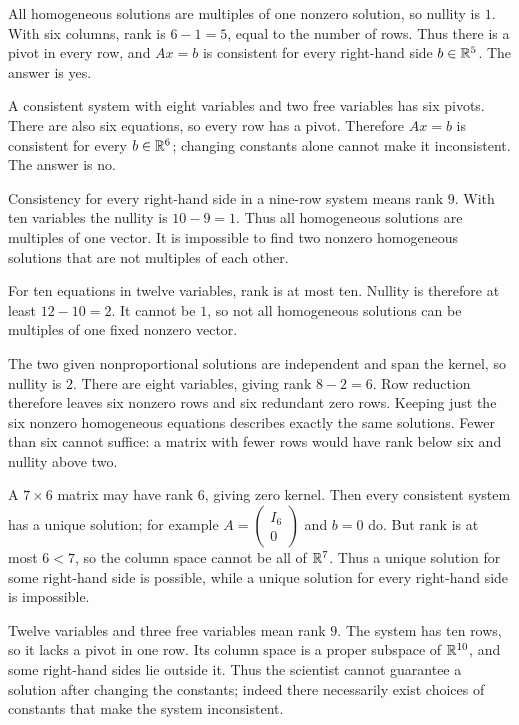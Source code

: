 All homogeneous solutions are multiples of one nonzero solution, so nullity
is $1$. With six columns, rank is $6-1=5$, equal to the number of rows.
Thus there is a pivot in every row, and $Ax=b$ is consistent for every
right-hand side $b\in\mathbb{R}^5$. The answer is yes.

A consistent system with eight variables and two free variables has six
pivots. There are also six equations, so every row has a pivot. Therefore
$Ax=b$ is consistent for every $b\in\mathbb{R}^6$; changing constants alone cannot
make it inconsistent. The answer is no.

Consistency for every right-hand side in a nine-row system means rank $9$.
With ten variables the nullity is $10-9=1$. Thus all homogeneous solutions
are multiples of one vector. It is impossible to find two nonzero
homogeneous solutions that are not multiples of each other.

For ten equations in twelve variables, rank is at most ten. Nullity is
therefore at least $12-10=2$. It cannot be $1$, so not all homogeneous
solutions can be multiples of one fixed nonzero vector.

The two given nonproportional solutions are independent and span the kernel,
so nullity is $2$. There are eight variables, giving rank $8-2=6$.
Row reduction therefore leaves six nonzero rows and six redundant zero rows.
Keeping just the six nonzero homogeneous equations describes exactly the same
solutions. Fewer than six cannot suffice: a matrix with fewer rows would
have rank below six and nullity above two.

A $7\times6$ matrix may have rank $6$, giving zero kernel. Then every
consistent system has a unique solution; for example
$A=\left(\begin{smallmatrix}I_6\\0\end{smallmatrix}\right)$ and $b=0$ do.
But rank is at most $6<7$, so the column space cannot be all of $\mathbb{R}^7$.
Thus a unique solution for some right-hand side is possible, while a unique
solution for every right-hand side is impossible.

Twelve variables and three free variables mean rank $9$. The system has ten
rows, so it lacks a pivot in one row. Its column space is a proper subspace
of $\mathbb{R}^{10}$, and some right-hand sides lie outside it. Thus the scientist
cannot guarantee a solution after changing the constants; indeed there
necessarily exist choices of constants that make the system inconsistent.

